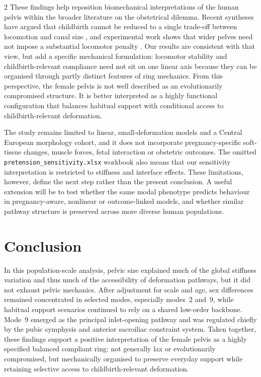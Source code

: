 \documentclass[openacc]{rsproca_new}
\begin{document}
\begin{multicols}{2}
These findings help reposition biomechanical interpretations of the human pelvis within the broader literature on the obstetrical dilemma. Recent syntheses have argued that childbirth cannot be reduced to a single trade-off between locomotion and canal size \cite{Pavlicev2020,Haeusler2021,Grunstra2023}, and experimental work shows that wider pelves need not impose a substantial locomotor penalty \cite{Warrener2015}. Our results are consistent with that view, but add a specific mechanical formulation: locomotor stability and childbirth-relevant compliance need not sit on one linear axis because they can be organised through partly distinct features of ring mechanics. From this perspective, the female pelvis is not well described as an evolutionarily compromised structure. It is better interpreted as a highly functional configuration that balances habitual support with conditional access to childbirth-relevant deformation.

The study remains limited to linear, small-deformation models and a Central European morphology cohort, and it does not incorporate pregnancy-specific soft-tissue changes, muscle forces, fetal interaction or obstetric outcomes. The omitted \texttt{pretension\_sensitivity.xlsx} workbook also means that our sensitivity interpretation is restricted to stiffness and interface effects. These limitations, however, define the next step rather than the present conclusion. A useful extension will be to test whether the same modal phenotype predicts behaviour in pregnancy-aware, nonlinear or outcome-linked models, and whether similar pathway structure is preserved across more diverse human populations.

\section{Conclusion}

In this population-scale analysis, pelvic size explained much of the global stiffness variation and thus much of the accessibility of deformation pathways, but it did not exhaust pelvic mechanics. After adjustment for scale and age, sex differences remained concentrated in selected modes, especially modes~2 and~9, while habitual support scenarios continued to rely on a shared low-order backbone. Mode~9 emerged as the principal inlet-opening pathway and was regulated chiefly by the pubic symphysis and anterior sacroiliac constraint system. Taken together, these findings support a positive interpretation of the female pelvis as a highly specified balanced compliant ring: not generally lax or evolutionarily compromised, but mechanically organised to preserve everyday support while retaining selective access to childbirth-relevant deformation.


\end{multicols}
\end{document}
